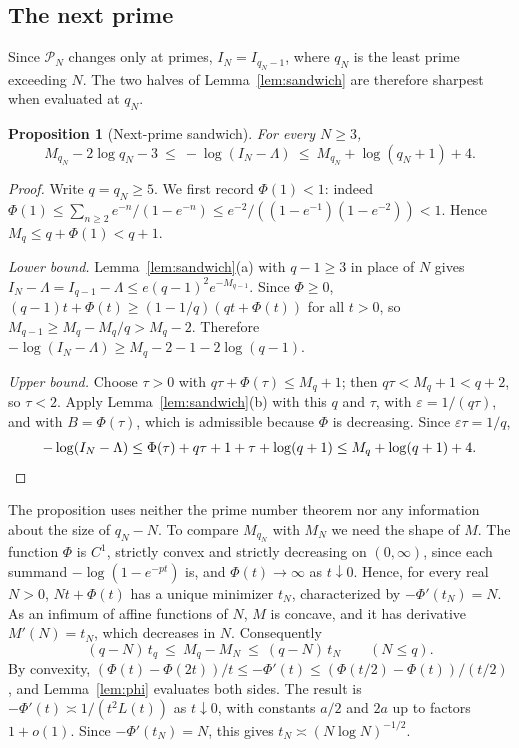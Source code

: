 \documentclass[11pt]{article}
\newtheorem{proposition}[theorem]{Proposition}
\theoremstyle{remark}
\newcommand{\Prm}{\mathcal{P}}
\begin{document}
\subsection{The next prime}\label{sec:nextprime}
Since $\Prm_N$ changes only at primes, $I_N=I_{q_N-1}$, where $q_N$ is
the least prime exceeding $N$. The two halves of
Lemma~\ref{lem:sandwich} are therefore sharpest when evaluated at
$q_N$.

\begin{proposition}[Next-prime sandwich]\label{prop:nextprime}
For every $N\ge3$,
\[
  M_{q_N}-2\log q_N-3\ \le\ -\log(I_N-\Lambda)\ \le\ M_{q_N}+\log(q_N+1)+4 .
\]
\end{proposition}

\begin{proof}
Write $q=q_N\ge5$. We first record $\Phi(1)<1$: indeed
$\Phi(1)\le\sum_{n\ge2}e^{-n}/(1-e^{-n})\le e^{-2}/((1-e^{-1})(1-e^{-2}))<1$.
Hence $M_q\le q+\Phi(1)<q+1$.

\emph{Lower bound.} Lemma~\ref{lem:sandwich}(a) with $q-1\ge3$ in place
of $N$ gives
$I_N-\Lambda=I_{q-1}-\Lambda\le e(q-1)^2e^{-M_{q-1}}$. Since $\Phi\ge0$,
$(q-1)t+\Phi(t)\ge(1-1/q)(qt+\Phi(t))$ for all $t>0$, so
$M_{q-1}\ge M_q-M_q/q>M_q-2$. Therefore
$-\log(I_N-\Lambda)\ge M_q-2-1-2\log(q-1)$.

\emph{Upper bound.} Choose $\tau>0$ with $q\tau+\Phi(\tau)\le M_q+1$;
then $q\tau<M_q+1<q+2$, so $\tau<2$. Apply Lemma~\ref{lem:sandwich}(b)
with this $q$ and $\tau$, with $\varepsilon=1/(q\tau)$, and with
$B=\Phi(\tau)$, which is admissible because $\Phi$ is decreasing. Since
$\varepsilon\tau=1/q$,
\[
  -\log(I_N-\Lambda)\le\Phi(\tau)+q\tau+1+\tau+\log(q+1)
  \le M_q+\log(q+1)+4. \qedhere
\]
\end{proof}

The proposition uses neither the prime number theorem nor any
information about the size of $q_N-N$. To compare $M_{q_N}$ with $M_N$
we need the shape of $M$. The function $\Phi$ is $C^1$, strictly
convex and strictly decreasing on $(0,\infty)$, since each summand
$-\log(1-e^{-pt})$ is, and $\Phi(t)\to\infty$ as $t\downarrow0$.
Hence, for every real $N>0$, $Nt+\Phi(t)$ has a unique minimizer $t_N$,
characterized by $-\Phi'(t_N)=N$. As an infimum of affine functions of
$N$, $M$ is concave, and it has derivative $M'(N)=t_N$, which decreases
in $N$. Consequently
\begin{equation}\label{eq:Mslope}
  (q-N)\,t_q\ \le\ M_q-M_N\ \le\ (q-N)\,t_N\qquad(N\le q).
\end{equation}
By convexity,
$(\Phi(t)-\Phi(2t))/t\le-\Phi'(t)\le(\Phi(t/2)-\Phi(t))/(t/2)$, and
Lemma~\ref{lem:phi} evaluates both sides. The result is
$-\Phi'(t)\asymp1/(t^2L(t))$ as $t\downarrow0$, with constants $a/2$
and $2a$ up to factors $1+o(1)$. Since $-\Phi'(t_N)=N$, this gives
$t_N\asymp(N\log N)^{-1/2}$.
\end{document}
